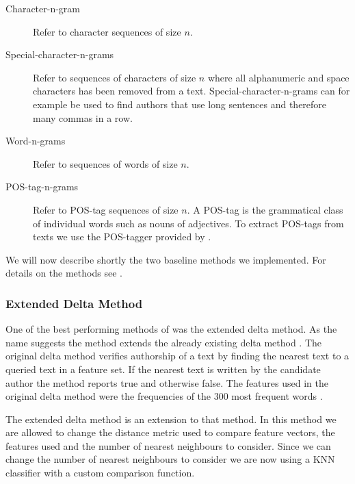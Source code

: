 \begin{description}

    \item[Character-n-gram]

        Refer to character sequences of size $n$.

    \item[Special-character-n-grams]

        Refer to sequences of characters of size $n$ where all alphanumeric and
        space characters has been removed from a text. Special-character-n-grams
        can for example be used to find authors that use long sentences and
        therefore many commas in a row.

    \item[Word-n-grams]

        Refer to sequences of words of size $n$.

    \item[\gls{POS}-tag-n-grams]

        Refer to \gls{POS}-tag sequences of size $n$. A \gls{POS}-tag is the
        grammatical class of individual words such as nouns of adjectives. To
        extract \gls{POS}-tags from texts we use the \gls{POS}-tagger provided
        by \citep{polyglot}.

\end{description}

We will now describe shortly the two baseline methods we implemented. For
details on the methods see \citep{US}.


\subsubsection{Extended Delta Method}

One of the best performing methods of \citet{US} was the extended delta method.
As the name suggests the method extends the already existing delta method
\citep{evert2015towards}. The original delta method verifies authorship of
a text by finding the nearest text to a queried text in a feature set. If
the nearest text is written by the candidate author the method reports true
and otherwise false. The features used in the original delta method were the
frequencies of the 300 most frequent words \citep{evert2015towards}.

The extended delta method is an extension to that method. In this method we are
allowed to change the distance metric used to compare feature vectors, the
features used and the number of nearest neighbours to consider. Since we can
change the number of nearest neighbours to consider we are now using a \gls{KNN}
classifier with a custom comparison function.

